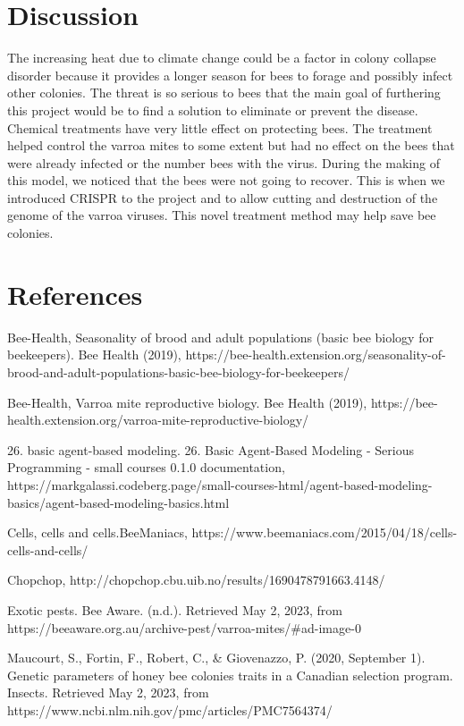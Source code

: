 \documentclass[final,5p,times,twocolumn,authoryear]{elsarticle}
\begin{document}
\section*{Discussion}
\label{Discussion}
The increasing heat due to climate change could be a factor in colony collapse disorder because it provides a longer season for bees to forage and possibly infect other colonies. The threat is so serious to bees that the main goal of furthering this project would be to find a solution to eliminate or prevent the disease. Chemical treatments have very little effect on protecting bees. The treatment helped control the varroa mites to some extent but had no effect on the bees that were already infected or the number bees with the virus. During the making of this model, we noticed that the bees were not going to recover. This is when we introduced CRISPR to the project and to allow cutting and destruction of the genome of the varroa viruses. This novel treatment method may help save bee colonies.  

\section{References}
\label{References}
Bee-Health, Seasonality of brood and adult populations (basic bee biology for beekeepers). Bee Health (2019), https://bee-health.extension.org/seasonality-of-brood-and-adult-populations-basic-bee-biology-for-beekeepers/ 

 Bee-Health, Varroa mite reproductive biology. Bee Health (2019), https://bee-health.extension.org/varroa-mite-reproductive-biology/ 

 26. basic agent-based modeling. 26. Basic Agent-Based Modeling - Serious Programming - small courses 0.1.0 documentation, https://markgalassi.codeberg.page/small-courses-html/agent-based-modeling-basics/agent-based-modeling-basics.html 

 Cells, cells and cells.BeeManiacs, https://www.beemaniacs.com/2015/04/18/cells-cells-and-cells/ 

 Chopchop, http://chopchop.cbu.uib.no/results/1690478791663.4148/ 

 Exotic pests. Bee Aware. (n.d.). Retrieved May 2, 2023, from https://beeaware.org.au/archive-pest/varroa-mites/#ad-image-0 

 Maucourt, S., Fortin, F., Robert, C., & Giovenazzo, P. (2020, September 1). Genetic parameters of honey bee colonies traits in a Canadian selection program. Insects. Retrieved May 2, 2023, from https://www.ncbi.nlm.nih.gov/pmc/articles/PMC7564374/  
\end{document}
